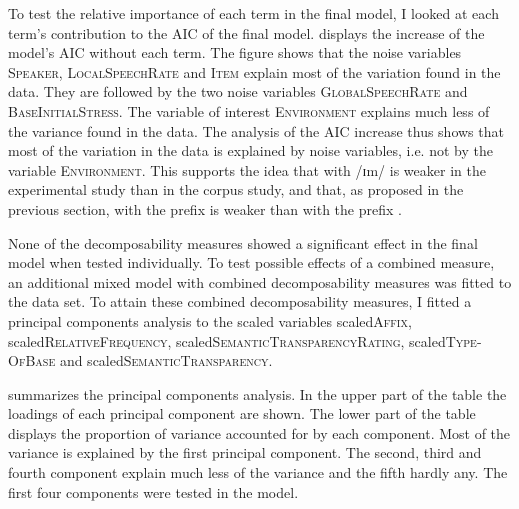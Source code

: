 To test the relative importance of each term in the final model, I looked at each term's contribution to the AIC of the final model.  displays the increase of the model's AIC  without each term. 
The figure shows that the noise variables \textsc{Speaker}, \textsc{LocalSpeechRate} and \textsc{Item} explain  most of the variation found in the data. They are followed by the two noise variables \textsc{GlobalSpeechRate} and \textsc{BaseInitialStress}. The variable of interest \textsc{Environment} explains much less of the variance found in the data. The analysis of the AIC increase thus shows that most of the variation in the data is explained by noise variables, i.e. not by the variable \textsc{Environment}. This supports the idea that  with /ɪm/  is weaker in the experimental study than in the corpus study, and that, as proposed in the previous section,  with the prefix  is weaker than  with the prefix  . 




None of the decomposability measures showed a significant effect in the final model when tested individually. To test possible effects of a combined  measure, an additional mixed model with combined decomposability measures was fitted to the data set.  
To attain these combined decomposability measures, I fitted a principal components analysis to the scaled variables scaled\textsc{Affix}, scaled\textsc{RelativeFrequency}, scaled\textsc{SemanticTransparencyRating}, scaled\textsc{Type-OfBase} and scaled\textsc{SemanticTransparency}.





 summarizes the principal components analysis. In the upper part of the table the loadings of each principal component are shown. The lower part of the table displays the proportion of variance accounted for by each component. 
Most of the variance is explained by the first principal component. The second, third and fourth component explain much less of the variance and the fifth hardly any.  The first four components were tested in the model. 


